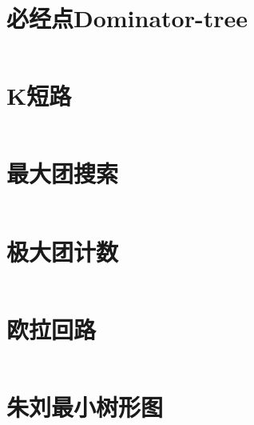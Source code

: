 \section{必经点Dominator-tree}
\inputminted{cpp}{\source/graph-theory/dominator.cpp}
\section{K短路}
\inputminted{cpp}{\source/graph-theory/Kth-minimum-path.cpp}
\section{最大团搜索}
\inputminted{cpp}{\source/graph-theory/最大团搜索.cpp}
\section{极大团计数}
\inputminted{cpp}{\source/graph-theory/极大团计数.cpp}
\section{欧拉回路}
\inputminted{cpp}{\source/graph-theory/euler-tour.cpp}
\section{朱刘最小树形图}
\inputminted{cpp}{\source/graph-theory/minimum_arborescence.cpp}
